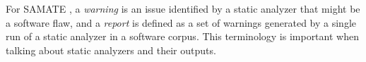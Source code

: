 For SAMATE \cite{black_counting_2011}, a \textit{warning} is an issue identified
by a static analyzer that might be a software flaw, and a \textit{report} is
defined as a set of warnings generated by a single run of a static analyzer in
a software corpus. This terminology is important when talking about static
analyzers and their outputs.





